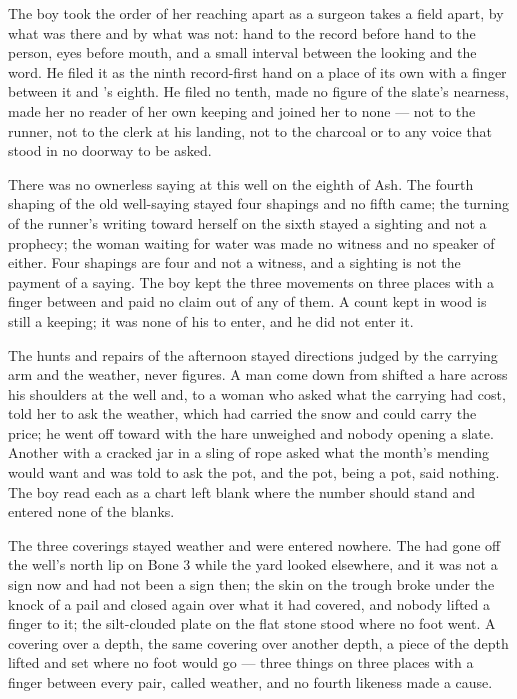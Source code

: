 The boy took the order of her reaching apart as a surgeon takes a field apart, by what was there and by what was not: hand to the record before hand to the person, eyes before mouth, and a small interval between the looking and the word. He filed it as the ninth record-first hand on a place of its own with a finger between it and 's eighth. He filed no tenth, made no figure of the slate's nearness, made her no reader of her own keeping and joined her to none --- not to the runner, not to the clerk at his landing, not to the charcoal or to any voice that stood in no doorway to be asked.

There was no ownerless saying at this well on the eighth of Ash. The fourth shaping of the old well-saying stayed four shapings and no fifth came; the turning of the runner's writing toward herself on the sixth stayed a sighting and not a prophecy; the woman waiting for water was made no witness and no speaker of either. Four shapings are four and not a witness, and a sighting is not the payment of a saying. The boy kept the three movements on three places with a finger between and paid no claim out of any of them. A count kept in wood is still a keeping; it was none of his to enter, and he did not enter it.

\scenebreak

The hunts and repairs of the afternoon stayed directions judged by the carrying arm and the weather, never figures. A man come down from  shifted a hare across his shoulders at the well and, to a woman who asked what the carrying had cost, told her to ask the weather, which had carried the snow and could carry the price; he went off toward  with the hare unweighed and nobody opening a slate. Another with a cracked jar in a sling of rope asked what the month's mending would want and was told to ask the pot, and the pot, being a pot, said nothing. The boy read each as a chart left blank where the number should stand and entered none of the blanks.

The three coverings stayed weather and were entered nowhere. The  had gone off the well's north lip on Bone 3 while the yard looked elsewhere, and it was not a sign now and had not been a sign then; the skin on the trough broke under the knock of a pail and closed again over what it had covered, and nobody lifted a finger to it; the silt-clouded plate on the flat stone stood where no foot went. A covering over a depth, the same covering over another depth, a piece of the depth lifted and set where no foot would go --- three things on three places with a finger between every pair, called weather, and no fourth likeness made a cause.

